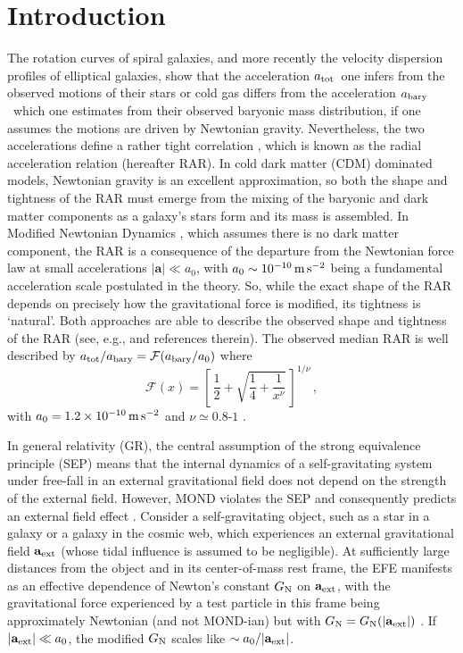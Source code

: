 \documentclass[usenatbib]{mnras}
\newcommand{\atot}{\ensuremath{a_{\rm tot}}}
\newcommand{\abary}{\ensuremath{a_{\rm bary}}}
\newcommand{\aext}{\ensuremath{\mathbf{a}_{\rm ext}}}
\newcommand{\msq}{\ensuremath{{\rm \,m\,s}^{-2}}}
\newcommand{\be}{\begin{equation}}
\newcommand{\ee}{\end{equation}}
\newcommand{\Cal}[1]{\ensuremath{\mathcal{#1}}}
\begin{document}
\section{Introduction}
\label{sec:intro}
\noindent
%
The rotation curves of spiral galaxies, and more recently the velocity dispersion profiles of elliptical galaxies, show that the acceleration \atot\ one infers from the observed motions of their stars or cold gas differs from the acceleration \abary\ which one estimates from their observed baryonic mass distribution, if one assumes the motions are driven by Newtonian gravity.  Nevertheless, the two accelerations define a rather tight correlation \citep{mls16,janz+16,lmsp17,cbsg19,tian+20,efe20}, which is known as the radial acceleration relation (hereafter RAR).  In cold dark matter (CDM) dominated models, Newtonian gravity is an excellent approximation, so both the shape and tightness of the RAR must emerge from the mixing of the baryonic and dark matter components as a galaxy's stars form and its mass is assembled.  In Modified Newtonian Dynamics \citep[MOND,][]{milgrom83-MOND1,bm84}, which assumes there is no dark matter component, the RAR is a consequence of the departure from the Newtonian force law at small accelerations $|\mathbf{a}|\ll a_0$, with $a_0\sim10^{-10}\msq$ being a fundamental acceleration scale postulated in the theory. So, while the exact shape of the RAR depends on precisely how the gravitational force is modified, its tightness is `natural'.  Both approaches are able to describe the observed shape and tightness of the RAR 
(see, e.g., \citealp{dcl16,desmond17,navarro+17,ps21} and references therein).
The observed median RAR is well described by 
$\atot/\abary = {\cal F}(\abary/a_0)$ where
\be
\Cal{F}(x) = \left[\,\frac12 + \sqrt{\frac14+\frac{1}{x^\nu}}\,\right]^{1/\nu}\,,
\label{eq:simpleIF}
\ee
with $a_0=1.2\times10^{-10}\msq$ and $\nu\simeq0.8$-$1$ \citep{cbsg19,efe20}.

In general relativity (GR), the central assumption of the strong equivalence  principle (SEP) means that the internal dynamics of a self-gravitating system under free-fall in an external gravitational field does not depend on the strength of the external field.  However, MOND violates the SEP \citep[see][who presented a Lagrangian formulation of the theory]{bm84}  and consequently predicts an external field effect \citep[EFE,][]{milgrom83-MOND1}.
Consider a self-gravitating object, such as a star in a galaxy or a galaxy in the cosmic web, which experiences an external gravitational field $\aext$ (whose tidal influence is assumed to be negligible).
At sufficiently large distances from the object and in its center-of-mass rest frame, the EFE manifests as an effective dependence of Newton's constant $G_{\rm N}$ on  $\aext$, with the gravitational force experienced  by a test particle in this frame being approximately Newtonian (and not MOND-ian) but with $G_{\rm N}=G_{\rm N}(|\aext|)$ \citep[e.g., equation~32 of][]{bm84}. If $|\aext|\ll a_0$, the modified $G_{\rm N}$ scales like $\sim a_0/|\aext|$.
\end{document}
